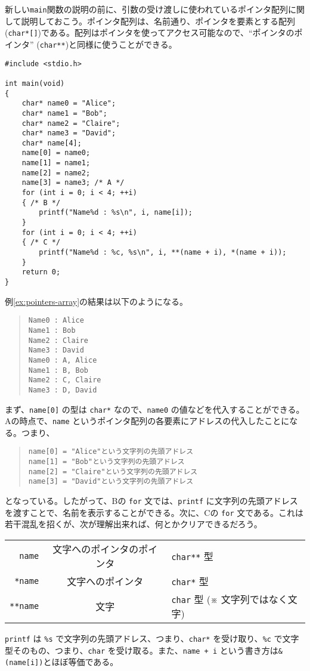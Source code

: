 新しい\texttt{main}関数の説明の前に、引数の受け渡しに使われているポインタ配列に関して説明しておこう。ポインタ配列は、名前通り、ポインタを要素とする配列(\texttt{char*[]})である。配列はポインタを使ってアクセス可能なので、``ポインタのポインタ'' (\texttt{char**})と同様に使うことができる。
\begin{reidai}\label{ex:pointers-array}
    \begin{verbatim}
#include <stdio.h>

int main(void)
{
    char* name0 = "Alice";
    char* name1 = "Bob";
    char* name2 = "Claire";
    char* name3 = "David";
    char* name[4];
    name[0] = name0;
    name[1] = name1;
    name[2] = name2;
    name[3] = name3; /* A */
    for (int i = 0; i < 4; ++i)
    { /* B */
        printf("Name%d : %s\n", i, name[i]);
    }
    for (int i = 0; i < 4; ++i)
    { /* C */
        printf("Name%d : %c, %s\n", i, **(name + i), *(name + i));
    }
    return 0;
}
\end{verbatim}
\end{reidai} \noindent
例\ref{ex:pointers-array}の結果は以下のようになる。
\begin{quote}
    \begin{verbatim}
Name0 : Alice
Name1 : Bob
Name2 : Claire
Name3 : David
Name0 : A, Alice
Name1 : B, Bob
Name2 : C, Claire
Name3 : D, David
\end{verbatim}
\end{quote}
まず、\texttt{name[0]} の型は \texttt{char*} なので、\texttt{name0} の値などを代入することができる。Aの時点で、\texttt{name} というポインタ配列の各要素にアドレスの代入したことになる。つまり、
\begin{quote}
    \begin{verbatim}
name[0] = "Alice"という文字列の先頭アドレス
name[1] = "Bob"という文字列の先頭アドレス
name[2] = "Claire"という文字列の先頭アドレス
name[3] = "David"という文字列の先頭アドレス
\end{verbatim}
\end{quote}
となっている。したがって、Bの \texttt{for} 文では、\texttt{printf} に文字列の先頭アドレスを渡すことで、名前を表示することができる。次に、Cの \texttt{for} 文である。これは若干混乱を招くが、次が理解出来れば、何とかクリアできるだろう。
\begin{table}[H]
    \centering
    \begin{tabular}{r@{ = }c@{ = }l}
        \texttt{name}   & 文字へのポインタのポインタ & \texttt{char**} 型                      \\
        \texttt{*name}  & 文字へのポインタ           & \texttt{char*} 型                       \\
        \texttt{**name} & 文字                       & \texttt{char} 型 (※ 文字列ではなく文字)
    \end{tabular}
\end{table}
\texttt{printf} は \texttt{\%s} で文字列の先頭アドレス、つまり、\texttt{char*} を受け取り、\texttt{\%c} で文字型そのもの、つまり、\texttt{char} を受け取る。また、\texttt{name + i} という書き方は\texttt{\&(name[i])}とほぼ等価である。

